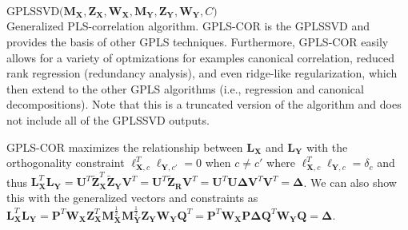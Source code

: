 \documentclass[12pt]{article}
\begin{document}
\begin{algorithm}
\DontPrintSemicolon
\SetAlgoLined
{}
\BlankLine
  $\mathrm{GPLSSVD(} {\mathbf M}_{\mathbf{X}}, {\mathbf Z}_{{\mathbf X}}, {\mathbf W}_{\mathbf{X}}, {\mathbf M}_{\mathbf{Y}}, {\mathbf Z}_{{\mathbf Y}}, {\mathbf W}_{\mathbf{Y}}, C \mathrm{)}$ \\
\caption{Generalized PLS-correlation algorithm. GPLS-COR is the GPLSSVD and provides the basis of other GPLS techniques. Furthermore, GPLS-COR easily allows for a variety of optmizations for examples canonical correlation, reduced rank regression (redundancy analysis), and even ridge-like regularization, which then extend to the other GPLS algorithms (i.e., regression and canonical decompositions). Note that this is a truncated version of the algorithm and does not include all of the GPLSSVD outputs.}
\label{algo:plsc}
\end{algorithm}

GPLS-COR maximizes the relationship between \({\mathbf L}_{\mathbf X}\)
and \({\mathbf L}_{\mathbf Y}\) with the orthogonality constraint
\({\boldsymbol \ell}_{{\mathbf X},c}^{T}{\boldsymbol \ell}_{{\mathbf Y},c'} = 0\)
when \(c \neq c'\) where
\({\boldsymbol \ell}_{{\mathbf X},c}^{T}{\boldsymbol \ell}_{{\mathbf Y},c} = \delta_{c}\)
and thus
\({\mathbf L}_{\mathbf X}^{T}{\mathbf L}_{\mathbf Y} = {\mathbf U}^{T}\widetilde{\mathbf Z}_{\mathbf X}^{T}\widetilde{\mathbf Z}_{\mathbf Y}{\mathbf V}^{T} = {\mathbf U}^{T}\widetilde{\mathbf Z}_{\mathbf R}{\mathbf V}^{T} = {\mathbf U}^{T}{\mathbf U}{\boldsymbol \Delta}{\mathbf V}^{T}{\mathbf V}^{T} = {\boldsymbol \Delta}\).
We can also show this with the generalized vectors and constraints as
\({\mathbf L}_{\mathbf X}^{T}{\mathbf L}_{\mathbf Y} = {\mathbf P}^{T}{\mathbf W}_{\mathbf X}{\mathbf Z}_{\mathbf X}^{T}{\mathbf M}_{\mathbf X}^{\frac{1}{2}}{\mathbf M}_{\mathbf Y}^{\frac{1}{2}}{\mathbf Z}_{\mathbf Y}{\mathbf W}_{\mathbf Y}{\mathbf Q}^{T} = {\mathbf P}^{T}{\mathbf W}_{\mathbf X}{\mathbf P}{\boldsymbol \Delta}{\mathbf Q}^{T}{\mathbf W}_{\mathbf Y}{\mathbf Q} = {\boldsymbol \Delta}\).
\end{document}

